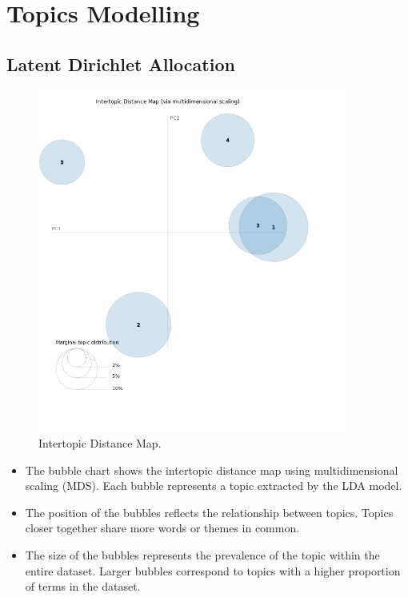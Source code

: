 

\section{Topics Modelling}
\label{sec:topicsmodelling}

\subsection{Latent Dirichlet Allocation}

\begin{center}
\begin{figure}[H]
  \centering
  \includegraphics[width=4in]{img/topics/png/topics.png}
  \caption{Intertopic Distance Map.}
  \label{Figure:intertopicdistancemap}
\end{figure}
\end{center}

\begin{itemize}
  \item The bubble chart shows the intertopic distance map using multidimensional
scaling (MDS). Each bubble represents a topic extracted by the LDA model.
  \item The position of the bubbles reflects the relationship between topics.
    Topics closer together share more words or themes in common.
  \item The size of the bubbles represents the prevalence of the topic within
    the entire dataset. Larger bubbles correspond to topics with a higher
    proportion of terms in the dataset.
\end{itemize}




